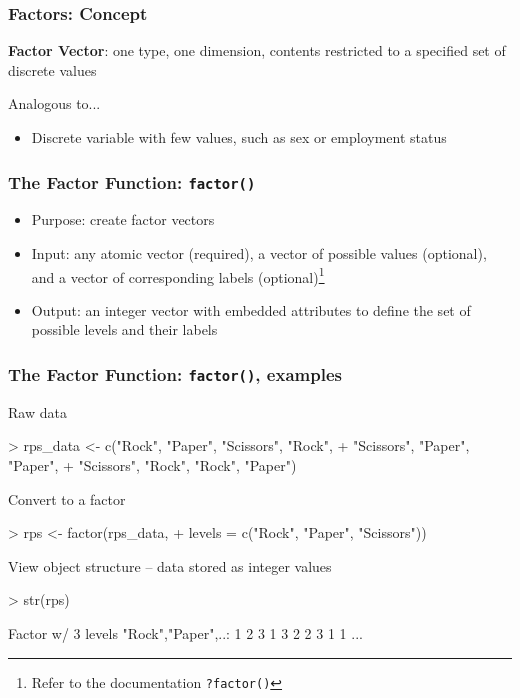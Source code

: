 \documentclass{beamer}
\newcommand{\R}[1]{\texttt{#1}}
\begin{document}
\begin{frame}[fragile]
\frametitle{Factors: Concept}

\textbf{Factor Vector}: one type,  one dimension, contents restricted to a specified set of discrete values
\pause

Analogous to...

\begin{itemize}
\item Discrete variable with few values, such as sex or employment status
\end{itemize}

\end{frame}





\begin{frame}[fragile]
\frametitle{The Factor Function: \R{factor()}}


\begin{itemize}
\item Purpose: create factor vectors
\item Input: any atomic vector (required), a vector of possible values (optional), and a vector of corresponding labels (optional)\footnote{Refer to the documentation \R{?factor()}} 
\item Output: an integer vector with embedded attributes to define the set of possible levels and their labels
\end{itemize}

\end{frame}



\begin{frame}[fragile]
\frametitle{The Factor Function: \R{factor()}, examples}

Raw data
\begin{Schunk}
\begin{Sinput}
> rps_data <- c("Rock", "Paper", "Scissors", "Rock", 
+               "Scissors", "Paper", "Paper", 
+               "Scissors", "Rock", "Rock", "Paper")
\end{Sinput}
\end{Schunk}
\pause
Convert to a factor
\begin{Schunk}
\begin{Sinput}
> rps <- factor(rps_data, 
+               levels = c("Rock", "Paper", "Scissors"))
\end{Sinput}
\end{Schunk}
\pause
View object structure -- data stored as integer values
\begin{Schunk}
\begin{Sinput}
> str(rps)
\end{Sinput}
\begin{Soutput}
 Factor w/ 3 levels "Rock","Paper",..: 1 2 3 1 3 2 2 3 1 1 ...
\end{Soutput}
\end{Schunk}

\end{frame}
\end{document}
